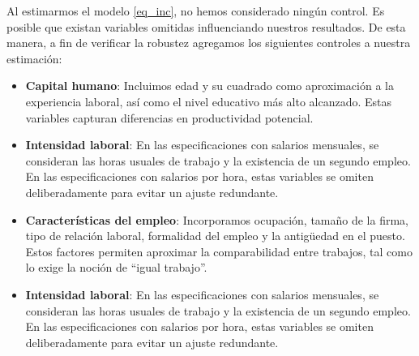 \documentclass[12pt,a4paper,onecolumn]{article}
\begin{document}
Al estimarmos el modelo \ref{eq_inc}, no hemos considerado ningún control. Es posible que existan variables omitidas influenciando nuestros resultados. De esta manera, a fin de verificar la robustez agregamos los siguientes controles a nuestra estimación:
\begin{itemize}
    \item \textbf{Capital humano}: Incluimos edad y su cuadrado como 
    aproximación a la experiencia laboral, así como el nivel educativo más alto 
    alcanzado. Estas variables capturan diferencias en productividad potencial.
    
    \item \textbf{Intensidad laboral}: En las especificaciones con salarios 
    mensuales, se consideran las horas usuales de trabajo y la existencia de un 
    segundo empleo. En las especificaciones con salarios por hora, estas 
    variables se omiten deliberadamente para evitar un ajuste redundante.

    \item \textbf{Características del empleo}: Incorporamos ocupación, tamaño 
    de la firma, tipo de relación laboral, formalidad del empleo y la antigüedad 
    en el puesto. Estos factores permiten aproximar la comparabilidad entre 
    trabajos, tal como lo exige la noción de ``igual trabajo''.


    \item \textbf{Intensidad laboral}: En las especificaciones con salarios 
    mensuales, se consideran las horas usuales de trabajo y la existencia de un 
    segundo empleo. En las especificaciones con salarios por hora, estas 
    variables se omiten deliberadamente para evitar un ajuste redundante.
\end{itemize}
\end{document}
